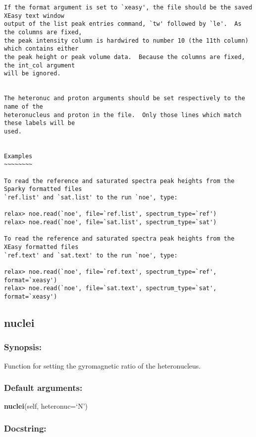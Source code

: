 {\begin{verbatim}
If the format argument is set to `xeasy', the file should be the saved XEasy text window
output of the list peak entries command, `tw' followed by `le'.  As the columns are fixed,
the peak intensity column is hardwired to number 10 (the 11th column) which contains either
the peak height or peak volume data.  Because the columns are fixed, the int_col argument
will be ignored.


The heteronuc and proton arguments should be set respectively to the name of the
heteronucleus and proton in the file.  Only those lines which match these labels will be
used.


Examples
~~~~~~~~

To read the reference and saturated spectra peak heights from the Sparky formatted files
`ref.list' and `sat.list' to the run `noe', type:

relax> noe.read(`noe', file=`ref.list', spectrum_type=`ref')
relax> noe.read(`noe', file=`sat.list', spectrum_type=`sat')

To read the reference and saturated spectra peak heights from the XEasy formatted files
`ref.text' and `sat.text' to the run `noe', type:

relax> noe.read(`noe', file=`ref.text', spectrum_type=`ref', format=`xeasy')
relax> noe.read(`noe', file=`sat.text', spectrum_type=`sat', format=`xeasy')
\end{verbatim}
}



\newpage

\subsection{nuclei}


\subsubsection{Synopsis:}

Function for setting the gyromagnetic ratio of the heteronucleus.

\subsubsection{Default arguments:}

\textsf{\textbf{nuclei}(self, heteronuc=`N')
}


\subsubsection{Docstring:}

